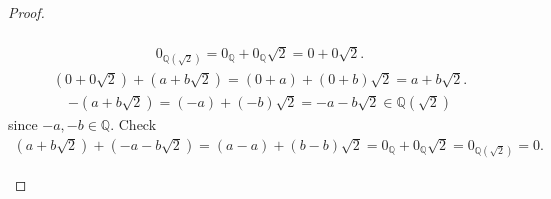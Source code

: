 \documentclass{amsart}
\newcommand{\bbq}{\mathbb{Q}}
\theoremstyle{plain}
\theoremstyle{definition}
\begin{document}
\begin{proof}
\begin{enumerate}[(a)]
\begin{align*}
				\end{align*}
				\begin{align*}
				0_{\bbq(\sqrt 2)} = 0_{\bbq} + 0_{\bbq}\sqrt 2 = 0 + 0\sqrt 2.
				\end{align*}
				\begin{align*}
				(0+0\sqrt 2) + (a+b\sqrt 2) = (0+a) + (0+b)\sqrt 2 = a + b\sqrt 2.
				\end{align*}
				\begin{align*}
				-(a+b\sqrt 2) = (-a)+(-b)\sqrt 2 = -a-b\sqrt 2 \in \bbq(\sqrt 2)
				\end{align*}
				since $-a,-b \in \bbq$. Check \\
				\begin{align*}
				(a+b\sqrt 2) +(-a-b\sqrt 2 ) = (a-a)+(b-b)\sqrt 2 = 0_{\bbq} + 0_{\bbq} \sqrt 2 = 0_{\bbq(\sqrt 2)} = 0.
			    \end{align*}


\end{enumerate}
\end{proof}
\end{document}
